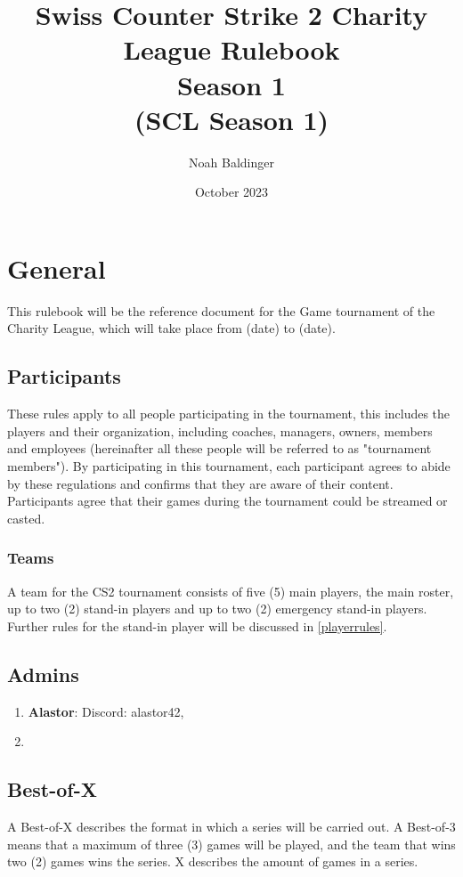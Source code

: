\documentclass{article}
\title{Swiss Counter Strike 2 Charity League Rulebook\\ Season 1\\(SCL Season 1)}
\author{Noah Baldinger}
\date{October 2023}
\begin{document}
\maketitle

\section{General}

This rulebook will be the reference document for the Game tournament of the Charity League, which will take place from (date) to (date). 

\subsection{Participants}
These rules apply to all people participating in the tournament, this 
includes the players and their organization, including coaches, managers, owners, members and employees (hereinafter all these people 
will be referred to as "tournament members"). By participating in this tournament, each participant agrees to abide by these regulations and confirms that they are aware of their content.\\
Participants agree that their games during the tournament could be streamed or casted.


\subsubsection{Teams}
A team for the CS2 tournament consists of five (5) main players, the main roster, up to two (2) stand-in players and up to two (2) 
emergency stand-in players. Further rules for the stand-in player will be discussed in \ref{playerrules}.


\subsection{Admins}

\begin{enumerate}
    \item \textbf{Alastor}: Discord: alastor42,
    \item \textbf{}
\end{enumerate}

\subsection{Best-of-X}
A Best-of-X describes the format in which a series will be carried out. A Best-of-3 means that a maximum of three (3) games will be 
played, and the team that wins two (2) games wins the series. X describes the amount of games in a series.
\end{document}

